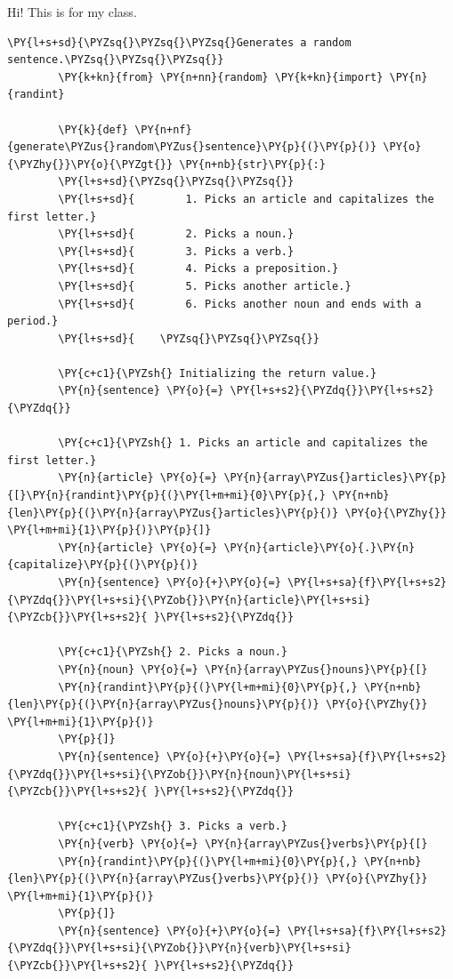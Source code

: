 Hi! This is for my  class.
\pagebreak
    \begin{tcolorbox}[breakable, size=fbox, boxrule=1pt, pad at break*=1mm,colback=cellbackground, colframe=cellborder]
	\begin{Verbatim}[commandchars=\\\{\}]
		\PY{l+s+sd}{\PYZsq{}\PYZsq{}\PYZsq{}Generates a random sentence.\PYZsq{}\PYZsq{}\PYZsq{}}
		\PY{k+kn}{from} \PY{n+nn}{random} \PY{k+kn}{import} \PY{n}{randint}
		
		\PY{k}{def} \PY{n+nf}{generate\PYZus{}random\PYZus{}sentence}\PY{p}{(}\PY{p}{)} \PY{o}{\PYZhy{}}\PY{o}{\PYZgt{}} \PY{n+nb}{str}\PY{p}{:}
		\PY{l+s+sd}{\PYZsq{}\PYZsq{}\PYZsq{}}
		\PY{l+s+sd}{        1. Picks an article and capitalizes the first letter.}
		\PY{l+s+sd}{        2. Picks a noun.}
		\PY{l+s+sd}{        3. Picks a verb.}
		\PY{l+s+sd}{        4. Picks a preposition.}
		\PY{l+s+sd}{        5. Picks another article.}
		\PY{l+s+sd}{        6. Picks another noun and ends with a period.}
		\PY{l+s+sd}{    \PYZsq{}\PYZsq{}\PYZsq{}}
		
		\PY{c+c1}{\PYZsh{} Initializing the return value.}
		\PY{n}{sentence} \PY{o}{=} \PY{l+s+s2}{\PYZdq{}}\PY{l+s+s2}{\PYZdq{}}
		
		\PY{c+c1}{\PYZsh{} 1. Picks an article and capitalizes the first letter.}
		\PY{n}{article} \PY{o}{=} \PY{n}{array\PYZus{}articles}\PY{p}{[}\PY{n}{randint}\PY{p}{(}\PY{l+m+mi}{0}\PY{p}{,} \PY{n+nb}{len}\PY{p}{(}\PY{n}{array\PYZus{}articles}\PY{p}{)} \PY{o}{\PYZhy{}} \PY{l+m+mi}{1}\PY{p}{)}\PY{p}{]}
		\PY{n}{article} \PY{o}{=} \PY{n}{article}\PY{o}{.}\PY{n}{capitalize}\PY{p}{(}\PY{p}{)}
		\PY{n}{sentence} \PY{o}{+}\PY{o}{=} \PY{l+s+sa}{f}\PY{l+s+s2}{\PYZdq{}}\PY{l+s+si}{\PYZob{}}\PY{n}{article}\PY{l+s+si}{\PYZcb{}}\PY{l+s+s2}{ }\PY{l+s+s2}{\PYZdq{}}
		
		\PY{c+c1}{\PYZsh{} 2. Picks a noun.}
		\PY{n}{noun} \PY{o}{=} \PY{n}{array\PYZus{}nouns}\PY{p}{[}
		\PY{n}{randint}\PY{p}{(}\PY{l+m+mi}{0}\PY{p}{,} \PY{n+nb}{len}\PY{p}{(}\PY{n}{array\PYZus{}nouns}\PY{p}{)} \PY{o}{\PYZhy{}} \PY{l+m+mi}{1}\PY{p}{)}
		\PY{p}{]}
		\PY{n}{sentence} \PY{o}{+}\PY{o}{=} \PY{l+s+sa}{f}\PY{l+s+s2}{\PYZdq{}}\PY{l+s+si}{\PYZob{}}\PY{n}{noun}\PY{l+s+si}{\PYZcb{}}\PY{l+s+s2}{ }\PY{l+s+s2}{\PYZdq{}}
		
		\PY{c+c1}{\PYZsh{} 3. Picks a verb.}
		\PY{n}{verb} \PY{o}{=} \PY{n}{array\PYZus{}verbs}\PY{p}{[}
		\PY{n}{randint}\PY{p}{(}\PY{l+m+mi}{0}\PY{p}{,} \PY{n+nb}{len}\PY{p}{(}\PY{n}{array\PYZus{}verbs}\PY{p}{)} \PY{o}{\PYZhy{}} \PY{l+m+mi}{1}\PY{p}{)}
		\PY{p}{]}
		\PY{n}{sentence} \PY{o}{+}\PY{o}{=} \PY{l+s+sa}{f}\PY{l+s+s2}{\PYZdq{}}\PY{l+s+si}{\PYZob{}}\PY{n}{verb}\PY{l+s+si}{\PYZcb{}}\PY{l+s+s2}{ }\PY{l+s+s2}{\PYZdq{}}
		

\end{Verbatim}
\end{tcolorbox}
